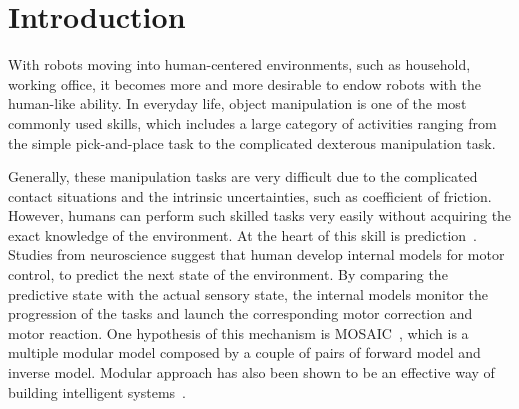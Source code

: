 \section{Introduction}
\label{intro}
With robots moving into human-centered environments, such as household, working office, it becomes more and more desirable to endow robots with the human-like ability. In everyday life, object manipulation is one of the most commonly used skills, which includes a large category of activities ranging from the simple pick-and-place task to the complicated dexterous manipulation task.


Generally, these manipulation tasks are very difficult due to the complicated contact situations and the intrinsic uncertainties, such as coefficient of friction. However, humans can perform such skilled tasks very easily without acquiring the exact knowledge of the environment. At the heart of this skill is prediction~\cite{flanagan2006control}. Studies from neuroscience suggest that human develop internal models for motor control, to predict the next state of the environment. By comparing the predictive state with the actual sensory state, the internal models monitor the progression of the tasks and launch the corresponding motor correction and motor reaction. One hypothesis of this mechanism is MOSAIC~\cite{haruno2001mosaic}, which is a multiple modular model composed by a couple of pairs of forward model and inverse model. Modular approach has also been shown to be an effective way of building intelligent systems~\cite{bryson2004modular,BrysonMcG12}.


